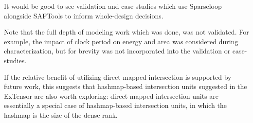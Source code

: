 It would be good to see validation and case studies which use Sparseloop alongside SAFTools to inform whole-design decisions.

Note that the full depth of modeling work which was done, was not validated. For example, the impact of clock period on energy and area was considered during characterization, but for brevity was not incorporated into the validation or case-studies.

If the relative benefit of utilizing direct-mapped intersection is supported by future work, this suggests that hashmap-based intersection units suggested in the ExTensor\cite{extensor} are also worth exploring: direct-mapped intersection units are essentially a special case of hashmap-based intersection units, in which the hashmap is the size of the dense rank.